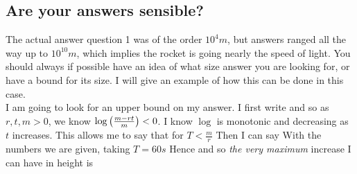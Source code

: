 \documentclass{article}
\begin{document}
\subsection{Are your answers sensible?}
The actual answer question 1 was of the order $10^4 m$, but answers ranged all the way up to $10^{10} m$, which implies the rocket is going nearly the speed of light. You should always if possible have an idea of what size answer you are looking for, or have a bound for its size. I will give an example of how this can be done in this case.\\
I am going to look for an upper bound on my answer. I first write 
and so as $r,t,m >0$, we know $\log\left( \frac{m-rt}{m} \right) < 0$. I know $\log$ is monotonic and decreasing as $t$ increases.  This allows me to say that for $T < \frac{m}{r}$
Then I can say 
With the numbers we are given, taking $T = 60s$
Hence 
and so \emph{the very maximum} increase I can have in height is 
\end{document}
